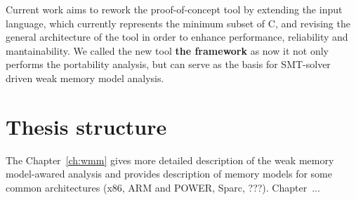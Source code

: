 

Current work aims to rework the proof-of-concept tool  by extending the input language, which currently represents the minimum subset of C, and revising the general architecture of the tool in order to enhance performance, reliability and mantainability.
We called the new tool \textbf{the  framework} as now it not only performs the portability analysis, but can serve as the basis for SMT-solver driven weak memory model analysis.

\section{Thesis structure}
\label{ch:intro:structure}

The Chapter~\ref{ch:wmm} gives more detailed description of the weak memory model-awared analysis and provides description of memory models for some common architectures (x86, ARM and POWER, Sparc, ???). Chapter~...

